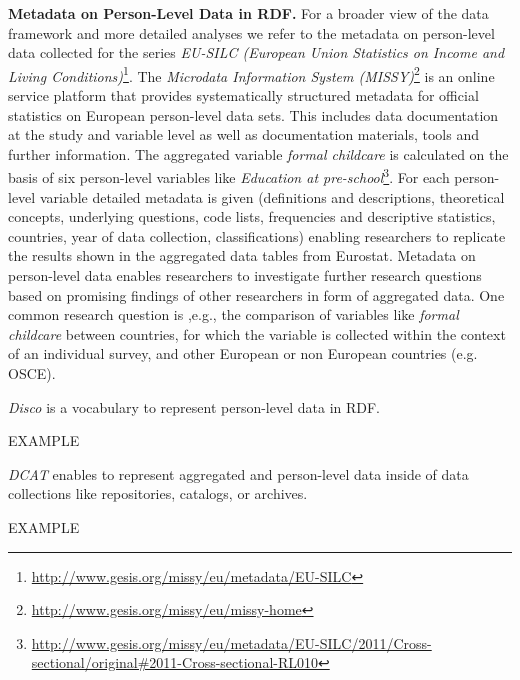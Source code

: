 \documentclass{llncs}
\begin{document}
\textbf{Metadata on Person-Level Data in RDF.}
For a broader view of the data framework and more detailed analyses we refer to the metadata on person-level data collected for the series \emph{EU-SILC (European Union Statistics on Income and Living Conditions)}\footnote{\url{http://www.gesis.org/missy/eu/metadata/EU-SILC}}.
The \emph{Microdata Information System (MISSY)}\footnote{\url{http://www.gesis.org/missy/eu/missy-home}} is an online service platform that provides systematically structured metadata for official statistics on European person-level data sets. This includes data documentation at the study and variable level as well as documentation materials, tools and further information. 
The aggregated variable \emph{formal childcare} is calculated on the basis of six person-level variables like 
\emph{Education at pre-school}\footnote{\url{http://www.gesis.org/missy/eu/metadata/EU-SILC/2011/Cross-sectional/original#2011-Cross-sectional-RL010}}.
For each person-level variable detailed metadata is given (definitions and descriptions, theoretical concepts, underlying questions, code lists, frequencies and descriptive statistics, countries, year of data collection, classifications) enabling researchers to replicate the results shown in the aggregated data tables from Eurostat.
Metadata on person-level data enables researchers to investigate further research questions based on promising findings of other researchers in form of aggregated data.
One common research question is ,e.g., the comparison of variables like 
\emph{formal childcare} between countries, for which the variable is collected within the context of an individual survey, and other European or non European countries (e.g. OSCE).



\emph{Disco} is a vocabulary to represent person-level data in RDF.

\begin{ex}
EXAMPLE
\end{ex}

\emph{DCAT} enables to represent aggregated and person-level data inside of data collections like repositories, catalogs, or archives. 

\begin{ex}
EXAMPLE
\end{ex}
\end{document}
